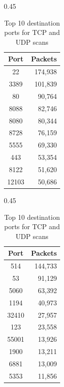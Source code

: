 \documentclass[a4paper,11pt]{article}
\begin{document}
\begin{table}[H]
  \centering
  \begin{subtable}[t]{0.45\textwidth}
    \centering
    \begin{tabular}{@{}cr@{}}
      \toprule
      \textbf{Port} & \textbf{Packets} \\
      \midrule
      22            & 174,938          \\
      3389          & 101,839          \\
      80            & 90,764           \\
      8088          & 82,746           \\
      8080          & 80,344           \\
      8728          & 76,159           \\
      5555          & 69,330           \\
      443           & 53,354           \\
      8122          & 51,620           \\
      12103         & 50,686           \\
      \bottomrule
    \end{tabular}
    \caption{TCP Scans}
    \label{tab:tcp-ports}
  \end{subtable}
  \hfill
  \begin{subtable}[t]{0.45\textwidth}
    \centering
    \begin{tabular}{@{}cr@{}}
      \toprule
      \textbf{Port} & \textbf{Packets} \\
      \midrule
      514           & 144,733          \\
      53            & 91,129           \\
      5060          & 63,392           \\
      1194          & 40,973           \\
      32410         & 27,957           \\
      123           & 23,558           \\
      55001         & 13,926           \\
      1900          & 13,211           \\
      6881          & 13,009           \\
      5353          & 11,856           \\
      \bottomrule
    \end{tabular}
    \caption{UDP Scans}
    \label{tab:udp-ports}
  \end{subtable}
  \caption{Top 10 destination ports for TCP and UDP scans}
  \label{tab:ports}
\end{table}
\end{document}
